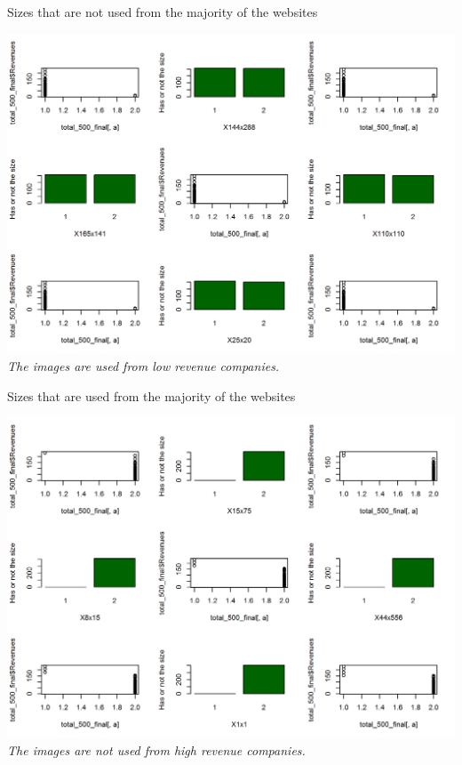 \documentclass{book}
\begin{document}
\begin{table}[H]
\centering
\caption{Sizes that are not used from the majority of the websites}
\begin{center}
\includegraphics[scale=0.5]{../R/photos/64_size_no.png}    \\
\textit{The images are used from low revenue companies.}
\end{center}
\end{table}
\begin{table}[H]
\centering
\caption{Sizes that are used from the majority of the websites}
\begin{center}
\includegraphics[scale=0.5]{../R/photos/65_size_yes.png}    \\
\textit{The images are not used from high revenue companies.}
\end{center}
\end{table}
\end{document}
